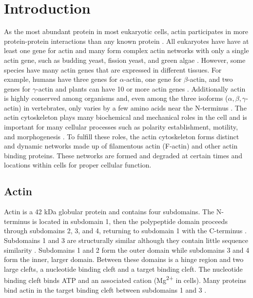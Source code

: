 
\chapter{Introduction}\label{ch:intro}
As the most abundant protein in most eukaryotic cells, actin participates in more protein-protein interactions than any known protein \citep{dominguez_actin_2011}. All eukaryotes have have at least one gene for actin and many form complex actin networks with only a single actin gene, such as budding yeast, fission yeast, and green algae \citep{pollard_actin_2016}. However, some species have many actin genes that are expressed in different tissues. For example, humans have three genes for $\alpha$-actin, one gene for $\beta$-actin, and two genes for $\gamma$-actin and plants can have 10 or more actin genes \citep{pollard_actin_2016}. Additionally actin is highly conserved among organisms and, even among the three isoforms ($\alpha, \beta, \gamma$-actin) in vertebrates, only varies by a few amino acids near the N-terminus \citep{dominguez_actin_2011}. The actin cytoskeleton plays many biochemical and mechanical roles in the cell and is important for many cellular processes such as polarity establishment, motility, and morphogenesis \citep{blanchoin_actin_2014}. To fulfill these roles, the actin cytoskeleton forms distinct and dynamic networks made up of filamentous actin (F-actin) and other actin binding proteins. These networks are formed and degraded at certain times and locations within cells for proper cellular function. 

\section{Actin}\label{actin-intro}

Actin is a 42 kDa globular protein and contains four subdomains. The N-terminus is located in subdomain 1, then the polypeptide domain proceeds through subdomains 2, 3, and 4, returning to subdomain 1 with the C-terminus \citep{pollard_actin_2016}. Subdomains 1 and 3 are structurally similar although they contain little sequence similarity \citep{dominguez_actin_2009,pollard_actin_2016}. Subdomains 1 and 2 form the outer domain while subdomains 3 and 4 form the inner, larger domain. Between these domains is a hinge region and two large clefts, a nucleotide binding cleft and a target binding cleft. The nucleotide binding cleft binds ATP and an associated cation (Mg\textsuperscript{2+} in cells). Many proteins bind actin in the target binding cleft between subdomains 1 and 3 \citep{dominguez_actin_2009}.

